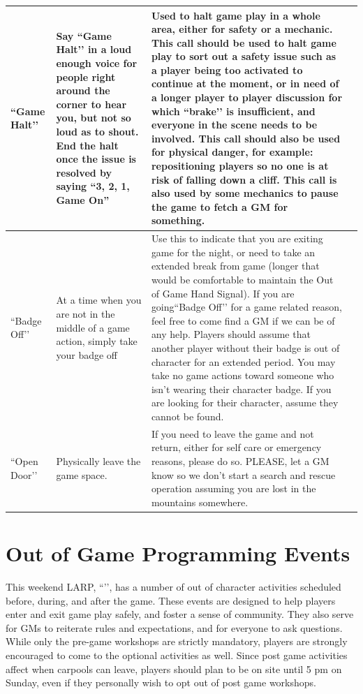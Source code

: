 \documentclass[sheet]{GL2020}
\begin{document}
\begin{tabularx}{\textwidth}{|>{\centering\arraybackslash} m{1.5cm} | >{\centering\arraybackslash} m{1.8cm} | >{\centering\arraybackslash} m{1.8cm} | >{\centering\arraybackslash}X |}
    \hline
``Game Halt’’ & Say ``Game Halt’’ in a loud enough voice for people right around the corner to hear you, but not so loud as to shout. End the halt once the issue is resolved by saying “3, 2, 1, Game On” &  Used to halt game play in a whole area, either for safety or a mechanic. This call should be used to halt game play to sort out a safety issue such as a player being too activated to continue at the moment, or in need of a longer player to player discussion for which ``brake’’ is insufficient, and everyone in the scene needs to be involved. This call should also be used for physical danger, for example: repositioning players so no one is at risk of falling down a cliff. This call is also used by some mechanics to pause the game to fetch a GM for something. \\
    \hline
``Badge Off’’ & At a time when you are not in the middle of a game action, simply take your badge off & Use this to indicate that you are exiting game for the night, or need to take an extended break from game (longer that would be comfortable to maintain the Out of Game Hand Signal). If you are going``Badge Off’’ for a game related reason, feel free to come find a GM if we can be of any help. Players should assume that another player without their badge is out of character for an extended period. You may take no game actions toward someone who isn’t wearing their character badge. If you are looking for their character, assume they cannot be found. \\
    \hline
``Open Door’’ & Physically leave the game space. & If you need to leave the game and not return, either for self care or emergency reasons, please do so. PLEASE, let a GM know so we don't start a search and rescue operation assuming you are lost in the mountains somewhere. \\
    \hline
 \end{tabularx}

\section{Out of Game Programming Events}
This weekend LARP, ``\gamename{}’’, has a number of out of character activities scheduled before, during, and after the game. These events are designed to help players enter and exit game play safely, and foster a sense of community. They also serve for GMs to reiterate rules and expectations, and for everyone to ask questions. While only the pre-game workshops are strictly mandatory, players are strongly encouraged to come to the optional activities as well. Since post game activities affect when carpools can leave, players should plan to be on site until 5 pm on Sunday, even if they personally wish to opt out of post game workshops.
\end{document}
